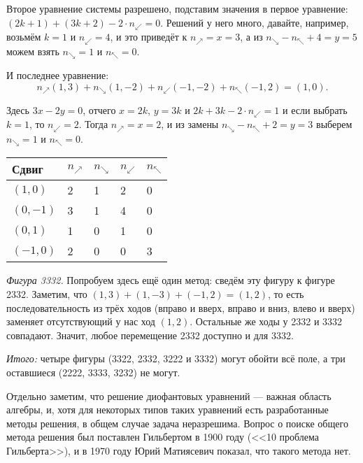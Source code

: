 \begin{itemize}
Второе уравнение системы разрешено, подставим значения в первое уравнение:
$(2k + 1) + (3k + 2) -2\cdot n_\swarrow = 0$. Решений у него много, давайте, например, 
возьмём $k = 1$ и $n_\swarrow=4$, и это приведёт к $n_\nearrow = x = 3$, а из 
$n_\searrow - n_\nwarrow + 4 = y = 5$ можем взять $n_\searrow = 1$ и $n_\nwarrow = 0$.


И последнее уравнение:
$$n_\nearrow(1,3) + n_\searrow(1,-2) + n_\swarrow(-1,-2) + n_\nwarrow(-1,2) = (1,0).$$

Здесь $3x - 2y = 0$, отчего $x = 2k$, $y = 3k$ и $2k + 3k - 2\cdot n_\swarrow = 1$ и
если выбрать $k=1$, то $n_\swarrow = 2$. Тогда $n_\nearrow = x = 2$, 
и из замены $n_\searrow - n_\nwarrow + 2 = y = 3$ выберем $n_\searrow = 1$ и $n_\nwarrow = 0$.


\begin{center}\begin{tabular}{lllll}
Сдвиг & $n_\nearrow$ & $n_\searrow$ & $n_\swarrow$ & $n_\nwarrow$ \\
\hline
$(1,0)$  & 2 & 1 & 2 & 0\\
$(0,-1)$ & 3 & 1 & 4 & 0\\
$(0,1)$  & 1 & 0 & 1 & 0\\
$(-1,0)$ & 2 & 0 & 0 & 3
\end{tabular}\end{center}

\emph{Фигура 3332.} Попробуем здесь ещё один метод: сведём эту фигуру к фигуре 2332. 
Заметим, что $(1,3)+(1,-3)+(-1,2) = (1,2)$, то есть последовательность из трёх ходов 
(вправо и вверх, вправо и вниз, влево и вверх) заменяет отсутствующий у нас ход $(1,2)$. 
Остальные же ходы у 2332 и 3332 совпадают. Значит, любое перемещение 2332 доступно и 
для 3332.

\emph{Итого:} четыре фигуры (3322, 2332, 3222 и 3332) могут обойти всё поле, а три оставшиеся
(2222, 3333, 3232) не могут.

Отдельно заметим, что решение диофантовых уравнений --- важная область алгебры, и, хотя для некоторых
типов таких уравнений есть разработанные методы решения, в общем случае задача неразрешима. 
Вопрос о поиске общего метода решения был поставлен Гильбертом в 1900 году (<<10 проблема Гильберта>>), 
и в 1970 году Юрий Матиясевич показал, что такого метода нет.

\end{itemize}

